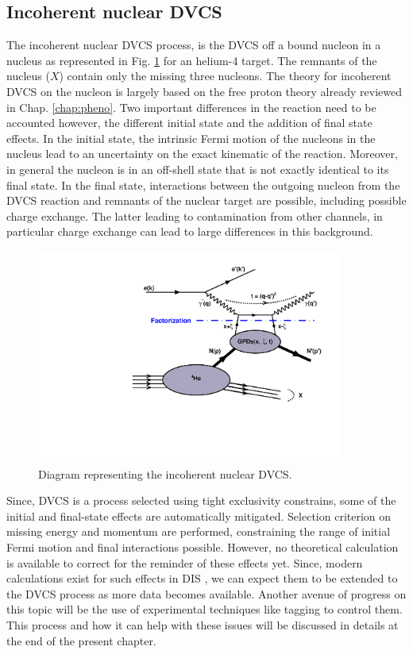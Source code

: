 \documentclass[aps,prc,preprint,superscriptaddress]{revtex4}
\begin{document}
\subsection{Incoherent nuclear DVCS}

The incoherent nuclear DVCS process, is the DVCS off a bound nucleon in a nucleus
as represented in Fig. \ref{fig:InCohDiag} for an helium-4 target. The remnants of 
the nucleus ($X$) contain only the missing three nucleons. 
The theory for incoherent DVCS on the nucleon is largely based on the free proton theory
already reviewed in Chap. \ref{chap:pheno}. Two important differences in the 
reaction need to be accounted however, the different initial state and the addition of 
final state effects. In the initial state, the intrinsic Fermi motion of the nucleons in the nucleus 
lead to an uncertainty on the exact kinematic of the reaction. Moreover, in general the nucleon 
is in an off-shell state that is not exactly identical to its final state. In the final state, 
interactions between the outgoing nucleon from the DVCS reaction and remnants of the nuclear 
target are possible, including possible charge exchange. The latter
leading to contamination from other channels, in particular charge exchange can lead to
large differences in this background. 

\begin{figure}[tbp!]
\center
\includegraphics[width=10cm]{fig3/handbag_incoherent.pdf}
\caption{Diagram representing the incoherent nuclear DVCS.}
\label{fig:InCohDiag}
\end{figure}

Since, DVCS is a 
process selected using tight exclusivity constrains, some of the initial and final-state effects are
automatically mitigated. Selection criterion on missing energy and momentum are performed,
constraining the range of initial Fermi motion and final interactions possible. However, no theoretical
calculation is available to correct for the reminder of these effects yet. Since, modern calculations exist 
for such effects in DIS \cite{Cosyn:2017ekf}, we can expect them to be extended to the DVCS 
process as more data becomes available. Another avenue of progress
on this topic will be the use of experimental techniques like tagging to control them. This process
and how it can help with these issues will be discussed
in details at the end of the present chapter.
\end{document}
